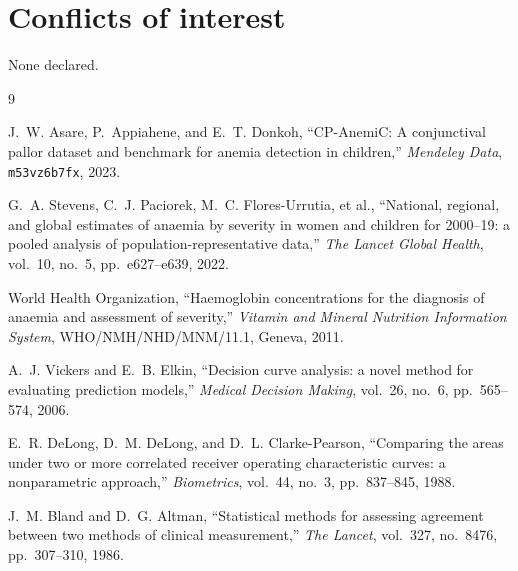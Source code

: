\documentclass[11pt,a4paper]{article}
\begin{document}
\section*{Conflicts of interest}

None declared.

\begin{thebibliography}{9}

J.~W. Asare, P.~Appiahene, and E.~T. Donkoh,
\newblock ``CP-AnemiC: A conjunctival pallor dataset and benchmark for anemia detection in
children,''
\newblock \emph{Mendeley Data}, \texttt{m53vz6b7fx}, 2023.

G.~A. Stevens, C.~J. Paciorek, M.~C. Flores-Urrutia, et al.,
\newblock ``National, regional, and global estimates of anaemia by severity in women and children
for 2000--19: a pooled analysis of population-representative data,''
\newblock \emph{The Lancet Global Health}, vol.~10, no.~5, pp.~e627--e639, 2022.

World Health Organization,
\newblock ``Haemoglobin concentrations for the diagnosis of anaemia and assessment of
severity,''
\newblock \emph{Vitamin and Mineral Nutrition Information System}, WHO/NMH/NHD/MNM/11.1,
Geneva, 2011.

A.~J. Vickers and E.~B. Elkin,
\newblock ``Decision curve analysis: a novel method for evaluating prediction models,''
\newblock \emph{Medical Decision Making}, vol.~26, no.~6, pp.~565--574, 2006.

E.~R. DeLong, D.~M. DeLong, and D.~L. Clarke-Pearson,
\newblock ``Comparing the areas under two or more correlated receiver operating
characteristic curves: a nonparametric approach,''
\newblock \emph{Biometrics}, vol.~44, no.~3, pp.~837--845, 1988.

J.~M. Bland and D.~G. Altman,
\newblock ``Statistical methods for assessing agreement between two methods of clinical
measurement,''
\newblock \emph{The Lancet}, vol.~327, no.~8476, pp.~307--310, 1986.

\end{thebibliography}
\end{document}
